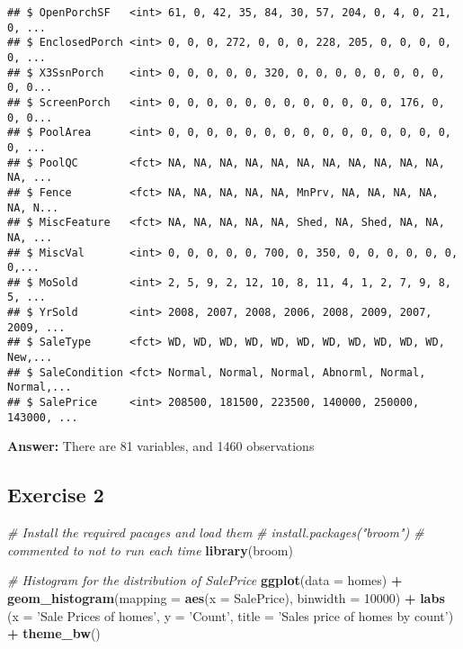 \documentclass[]{article}
\newenvironment{Shaded}{\begin{snugshade}}{\end{snugshade}}
\newcommand{\KeywordTok}[1]{\textcolor[rgb]{0.13,0.29,0.53}{\textbf{#1}}}
\newcommand{\DataTypeTok}[1]{\textcolor[rgb]{0.13,0.29,0.53}{#1}}
\newcommand{\DecValTok}[1]{\textcolor[rgb]{0.00,0.00,0.81}{#1}}
\newcommand{\StringTok}[1]{\textcolor[rgb]{0.31,0.60,0.02}{#1}}
\newcommand{\CommentTok}[1]{\textcolor[rgb]{0.56,0.35,0.01}{\textit{#1}}}
\newcommand{\OperatorTok}[1]{\textcolor[rgb]{0.81,0.36,0.00}{\textbf{#1}}}
\newcommand{\NormalTok}[1]{#1}
\begin{document}
\begin{verbatim}
## $ OpenPorchSF   <int> 61, 0, 42, 35, 84, 30, 57, 204, 0, 4, 0, 21, 0, ...
## $ EnclosedPorch <int> 0, 0, 0, 272, 0, 0, 0, 228, 205, 0, 0, 0, 0, 0, ...
## $ X3SsnPorch    <int> 0, 0, 0, 0, 0, 320, 0, 0, 0, 0, 0, 0, 0, 0, 0, 0...
## $ ScreenPorch   <int> 0, 0, 0, 0, 0, 0, 0, 0, 0, 0, 0, 0, 176, 0, 0, 0...
## $ PoolArea      <int> 0, 0, 0, 0, 0, 0, 0, 0, 0, 0, 0, 0, 0, 0, 0, 0, ...
## $ PoolQC        <fct> NA, NA, NA, NA, NA, NA, NA, NA, NA, NA, NA, NA, ...
## $ Fence         <fct> NA, NA, NA, NA, NA, MnPrv, NA, NA, NA, NA, NA, N...
## $ MiscFeature   <fct> NA, NA, NA, NA, NA, Shed, NA, Shed, NA, NA, NA, ...
## $ MiscVal       <int> 0, 0, 0, 0, 0, 700, 0, 350, 0, 0, 0, 0, 0, 0, 0,...
## $ MoSold        <int> 2, 5, 9, 2, 12, 10, 8, 11, 4, 1, 2, 7, 9, 8, 5, ...
## $ YrSold        <int> 2008, 2007, 2008, 2006, 2008, 2009, 2007, 2009, ...
## $ SaleType      <fct> WD, WD, WD, WD, WD, WD, WD, WD, WD, WD, WD, New,...
## $ SaleCondition <fct> Normal, Normal, Normal, Abnorml, Normal, Normal,...
## $ SalePrice     <int> 208500, 181500, 223500, 140000, 250000, 143000, ...
\end{verbatim}

\textbf{Answer:} There are 81 variables, and 1460 observations

\subsection{Exercise 2}\label{exercise-2}

\begin{Shaded}
\begin{Highlighting}[]
\CommentTok{# Install the required pacages and load them}
\CommentTok{# install.packages("broom") # commented to not to run each time}
\KeywordTok{library}\NormalTok{(broom)}

\CommentTok{# Histogram for the distribution of SalePrice}
\KeywordTok{ggplot}\NormalTok{(}\DataTypeTok{data =}\NormalTok{ homes) }\OperatorTok{+}
\StringTok{  }\KeywordTok{geom_histogram}\NormalTok{(}\DataTypeTok{mapping =} \KeywordTok{aes}\NormalTok{(}\DataTypeTok{x =}\NormalTok{ SalePrice), }\DataTypeTok{binwidth =} \DecValTok{10000}\NormalTok{) }\OperatorTok{+}\StringTok{ }
\StringTok{  }\KeywordTok{labs}\NormalTok{ (}\DataTypeTok{x =} \StringTok{'Sale Prices of homes'}\NormalTok{, }\DataTypeTok{y =} \StringTok{'Count'}\NormalTok{, }\DataTypeTok{title =} \StringTok{'Sales price of homes by count'}\NormalTok{) }\OperatorTok{+}
\StringTok{  }\KeywordTok{theme_bw}\NormalTok{()}
\end{Highlighting}
\end{Shaded}
\end{document}
